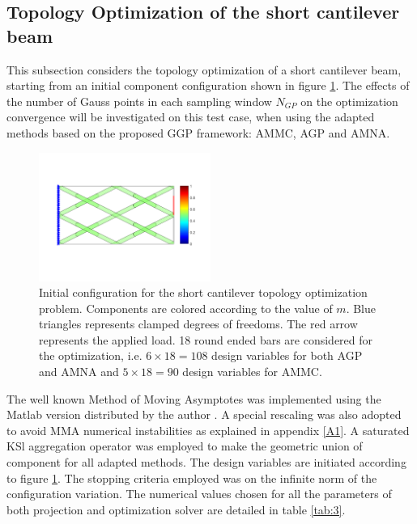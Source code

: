 \subsection{Topology Optimization of the short cantilever beam}
\label{SCB}
This subsection considers the topology optimization of a short cantilever beam, starting from an initial component configuration shown in figure \ref{fig:scb}. The effects of the number of Gauss points in each sampling window $N_{GP}$ on the optimization convergence will be investigated on this test case, when using the adapted methods based on the proposed GGP framework: AMMC, AGP and AMNA.
 \begin{figure}[!ht]
 \centering
  \includegraphics[width=0.5\textwidth]{images/Ch3/component_000.png}
\caption{Initial configuration for the short cantilever topology optimization problem. Components are colored according to the value of $m$. Blue triangles represents clamped degrees of freedoms. The red arrow represents the applied load. 18 round ended bars are considered for the optimization, i.e. $6\times 18=108$ design variables for both AGP and AMNA and $5\times 18=90$ design variables for AMMC.}
\label{fig:scb}       %
\end{figure}
The well known Method of Moving Asymptotes \cite{svanberg1987method} was implemented using the Matlab version distributed by the author \cite{svanberg2004some}. A special rescaling was also adopted to avoid MMA numerical instabilities as explained in appendix \ref{A1}. A saturated KSl aggregation operator was employed to make the geometric union of component for all adapted methods.
The design variables are initiated according to figure \ref{fig:scb}. The stopping criteria employed was on the infinite norm of the configuration variation. The numerical values chosen for all the parameters of both projection and optimization solver are detailed in table \ref{tab:3}. 

